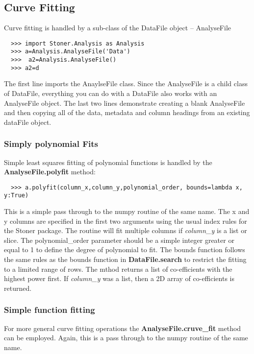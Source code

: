 \documentclass[a4paper,11pt]{scrartcl}
\begin{document}
\subsection{Curve Fitting}

Curve fitting is handled by a sub-class of the DataFile object -- AnalyseFile

\begin{verbatim}
  >>> import Stoner.Analysis as Analysis
  >>> a=Analysis.AnalyseFile('Data')
  >>>  a2=Analysis.AnalyseFile()
  >>> a2=d
\end{verbatim}

The first line imports the AnaylseFile class. Since the AnalyseFile is a child class of DataFile, everything you can do with a DataFile also works with an AnalyseFile object. The last two lines demonstrate creating a blank AnalyseFile and then copying all of the data, metadata and column headings from an existing dataFile object.

\subsubsection{Simply polynomial Fits}

Simple least squares fitting of polynomial functions is handled by the \textbf{AnalyseFile.polyfit} method:

\begin{verbatim}
  >>> a.polyfit(column_x,column_y,polynomial_order, bounds=lambda x, y:True)
\end{verbatim}

This is a simple pass through to the numpy routine of the same name. The x and y columns are specified in the first two arguments using the usual index rules for the Stoner package. The routine will fit multiple columns if \textit{column\_y} is a list or slice. The polynomial\_order parameter should be a simple integer greater or equal to 1 to define the degree of polynomial to fit. The bounds function follows the same rules as the bounds function in \textbf{DataFile.search} to restrict the fitting to a limited range of rows. The mthod returns a list of co-efficients with the highest power first. If \textit{column\_y} was a list, then a 2D array of co-efficients is returned.

\subsubsection{Simple function fitting}

For more general curve fitting operations the \textbf{AnalyseFile.cruve\_fit} method can be employed. Again, this is a pass through to the numpy routine of the same name.
\end{document}
